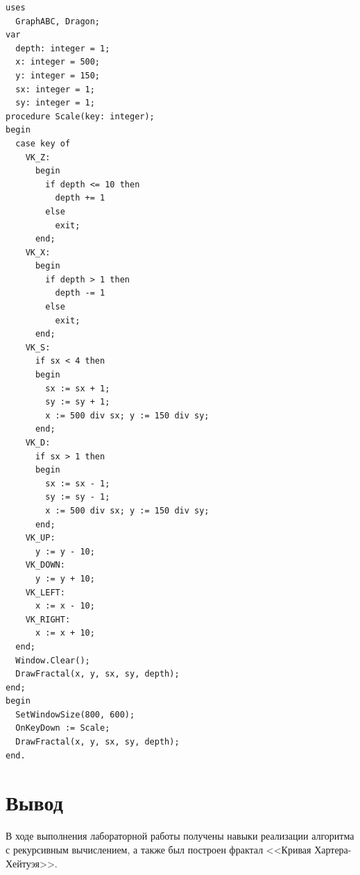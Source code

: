 \documentclass[a4paper,14pt]{extarticle}
\begin{document}
  \noindent
  \begin{Verbatim}[tabsize=4,fontsize=\small]
uses
  GraphABC, Dragon;
var
  depth: integer = 1;
  x: integer = 500;
  y: integer = 150;
  sx: integer = 1;
  sy: integer = 1;
procedure Scale(key: integer);
begin
  case key of
    VK_Z:
      begin
        if depth <= 10 then 
          depth += 1 
        else
          exit;
      end;
    VK_X:
      begin
        if depth > 1 then
          depth -= 1
        else
          exit;
      end;
    VK_S:
      if sx < 4 then
      begin
        sx := sx + 1;
        sy := sy + 1;
        x := 500 div sx; y := 150 div sy;
      end;
    VK_D:
      if sx > 1 then
      begin
        sx := sx - 1;
        sy := sy - 1;
        x := 500 div sx; y := 150 div sy;
      end;
    VK_UP:
      y := y - 10;
    VK_DOWN:
      y := y + 10;
    VK_LEFT:
      x := x - 10;
    VK_RIGHT:
      x := x + 10;
  end;
  Window.Clear();
  DrawFractal(x, y, sx, sy, depth);
end;
begin
  SetWindowSize(800, 600);
  OnKeyDown := Scale;
  DrawFractal(x, y, sx, sy, depth);
end.
  \end{Verbatim}

  \section*{Вывод}
  В ходе выполнения лабораторной работы получены навыки реализации алгоритма с рекурсивным вычислением, а также был построен фрактал <<Кривая Хартера-Хейтуэя>>.
\end{document}
